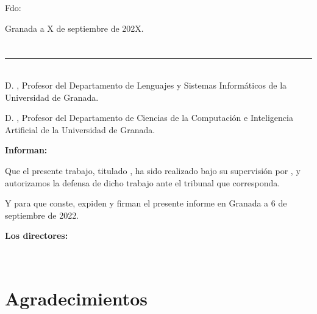 \vspace{6cm}

\noindent Fdo: \myName

\vspace{2cm}

\begin{flushright}
Granada a X de septiembre de 202X.
\end{flushright}


\chapter*{}
\thispagestyle{empty}

\noindent\rule[-1ex]{\textwidth}{2pt}\\[4.5ex]

D. \textbf{\myProf}, Profesor del Departamento de Lenguajes y Sistemas Informáticos de la Universidad de Granada.

\vspace{0.25cm}

D. \textbf{\myOtherProf}, Profesor del Departamento de Ciencias de la Computación e Inteligencia Artificial de la Universidad de Granada.


\vspace{0.25cm}

\textbf{Informan:}

\vspace{0.25cm}

Que el presente trabajo, titulado \textit{\textbf{\myTitle}},
ha sido realizado bajo su supervisión por \textbf{\myName}, y autorizamos la defensa de dicho trabajo ante el tribunal
que corresponda.

\vspace{0.5cm}

Y para que conste, expiden y firman el presente informe en Granada a 6 de septiembre de 2022.

\vspace{0.5cm}

\textbf{Los directores:}

\vspace{5cm}

\noindent \textbf{\myProf \ \ \ \ \ \ \ \ \ \ \ \ \ \myOtherProf}

\chapter*{Agradecimientos}
\thispagestyle{empty}

       \vspace{1cm}
